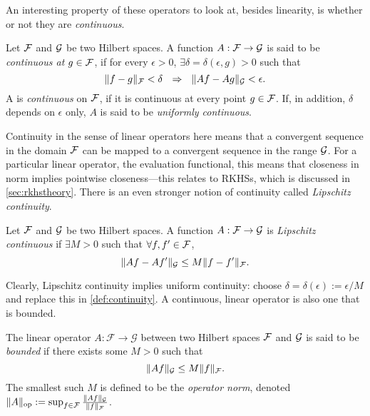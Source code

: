\vspace{-0.6em}
An interesting property of these operators to look at, besides linearity, is whether or not they are \emph{continuous}.

\begin{definition}[Continuity]\label{def:continuity}
  Let ${\mathcal F}$ and ${\mathcal G}$ be two Hilbert spaces.
  A function $A:{\mathcal F}\to{\mathcal G}$ is said to be \emph{continuous at $g\in{\mathcal F}$}, if for every $\epsilon>0$, $\exists \delta=\delta(\epsilon,g)>0$ such that
  \[
    \norm{f-g}_\cF < \delta \ \ \Rightarrow \ \ \norm{Af - Ag}_\cG < \epsilon.
  \]
  A is \emph{continuous} on ${\mathcal F}$, if it is continuous at every point $g \in{\mathcal F}$.
  If, in addition, $\delta$ depends on $\epsilon$ only, $A$ is said to be \emph{uniformly continuous}.
\end{definition}

Continuity in the sense of linear operators here means that a convergent sequence in the domain ${\mathcal F}$ can be mapped to a convergent sequence in the range ${\mathcal G}$.
For a particular linear operator, the evaluation functional, this means that closeness in norm implies pointwise closeness---this relates to RKHSs, which is discussed in \cref{sec:rkhstheory}.
There is an even stronger notion of continuity called  \emph{Lipschitz continuity}.

\begin{definition}
  Let ${\mathcal F}$ and ${\mathcal G}$ be two Hilbert spaces.  
  A function $A:{\mathcal F}\to{\mathcal G}$ is \emph{Lipschitz continuous} if $\exists M >0$ such that $\forall f,f'\in{\mathcal F}$,
  \[
    \lVert Af - Af'\rVert_{\mathcal G} \leq M \lVert f - f'\rVert_{\mathcal F}.
  \]
\end{definition}

\vspace{-0.75em}
Clearly, Lipschitz continuity implies uniform continuity: choose $\delta = \delta(\epsilon) := \epsilon/M$ and replace this in  \cref{def:continuity}.
A continuous, linear operator is also one that is bounded.

\begin{definition}\label{def:boundedop}
  The linear operator $A:\mathcal F \rightarrow \mathcal G$ between two Hilbert spaces ${\mathcal F}$ and ${\mathcal G}$ is said to be \emph{bounded} if there exists some $M>0$ such that
  \[
    \norm{Af}_\cG \leq M \norm{f}_\cF.\vspace{-0.4em}
  \]
  The smallest such $M$ is defined to be the \emph{operator norm}, denoted $\lVert A\rVert_{\text{op}} := \sup_{f\in{\mathcal F}} \frac{\lVert Af\rVert_{\mathcal G}}{\lVert f\rVert_{\mathcal F}}$.
\end{definition}

